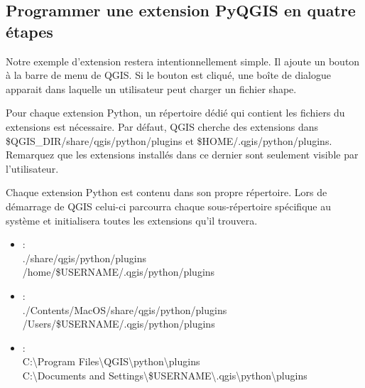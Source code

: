 \subsection{Programmer une extension PyQGIS en quatre étapes}\label{subsec:pyfoursteps}

Notre exemple d'extension restera intentionnellement simple. Il ajoute un bouton à
la barre de menu de QGIS. Si le bouton est cliqué, une boîte de dialogue
apparait dans laquelle un utilisateur peut charger un fichier shape.

Pour chaque extension Python, un répertoire dédié qui contient les fichiers du
extensions est nécessaire. Par défaut, QGIS cherche des extensions dans
\$QGIS\_DIR/share/qgis/python/plugins et \$HOME/.qgis/python/plugins.
Remarquez que les extensions installés dans ce dernier  sont seulement visible
par l'utilisateur.


Chaque extension Python est contenu dans son propre répertoire. Lors de démarrage
de QGIS celui-ci parcourra chaque sous-répertoire spécifique au système et
initialisera toutes les extensions qu'il trouvera.

\begin{itemize}
\item {} : \\
./share/qgis/python/plugins \\
/home/\$USERNAME/.qgis/python/plugins
\item {}:\\
./Contents/MacOS/share/qgis/python/plugins \\
/Users/\$USERNAME/.qgis/python/plugins
\item {}:\\
C:\textbackslash Program Files\textbackslash QGIS\textbackslash python\textbackslash plugins \\
C:\textbackslash Documents and Settings\textbackslash\$USERNAME\textbackslash .qgis\textbackslash python\textbackslash plugins

\end{itemize}

